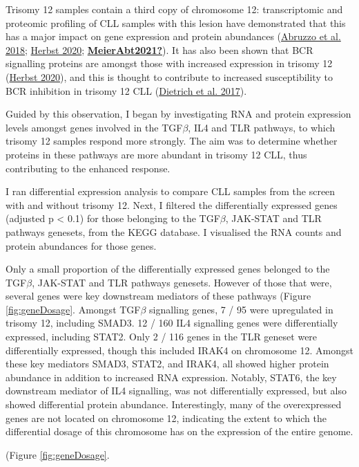 \documentclass[11pt, a4paper, twosided]{book}
\begin{document}
Trisomy 12 samples contain a third copy of chromosome 12: transcriptomic and proteomic profiling of CLL samples with this lesion have demonstrated that this has a major impact on gene expression and protein abundances (\protect\hyperlink{ref-Abruzzo2018}{Abruzzo et al. 2018}; \protect\hyperlink{ref-HerbstThesis}{Herbst 2020}; \protect\hyperlink{ref-MeierAbt2021}{\textbf{MeierAbt2021?}}). It has also been shown that BCR signalling proteins are amongst those with increased expression in trisomy 12 (\protect\hyperlink{ref-HerbstThesis}{Herbst 2020}), and this is thought to contribute to increased susceptibility to BCR inhibition in trisomy 12 CLL (\protect\hyperlink{ref-JCIpaper}{Dietrich et al. 2017}).

Guided by this observation, I began by investigating RNA and protein expression levels amongst genes involved in the TGF\(\beta\), IL4 and TLR pathways, to which trisomy 12 samples respond more strongly. The aim was to determine whether proteins in these pathways are more abundant in trisomy 12 CLL, thus contributing to the enhanced response.

I ran differential expression analysis to compare CLL samples from the screen with and without trisomy 12. Next, I filtered the differentially expressed genes (adjusted p \textless{} 0.1) for those belonging to the TGF\(\beta\), JAK-STAT and TLR pathways genesets, from the KEGG database. I visualised the RNA counts and protein abundances for those genes.

Only a small proportion of the differentially expressed genes belonged to the TGF\(\beta\), JAK-STAT and TLR pathways genesets. However of those that were, several genes were key downstream mediators of these pathways (Figure \ref{fig:geneDosage}. Amongst TGF\(\beta\) signalling genes, 7 / 95 were upregulated in trisomy 12, including SMAD3. 12 / 160 IL4 signalling genes were differentially expressed, including STAT2. Only 2 / 116 genes in the TLR geneset were differentially expressed, though this included IRAK4 on chromosome 12. Amongst these key mediators SMAD3, STAT2, and IRAK4, all showed higher protein abundance in addition to increased RNA expression. Notably, STAT6, the key downstream mediator of IL4 signalling, was not differentially expressed, but also showed differential protein abundance. Interestingly, many of the overexpressed genes are not located on chromosome 12, indicating the extent to which the differential dosage of this chromosome has on the expression of the entire genome.

(Figure \ref{fig:geneDosage}.
\end{document}
